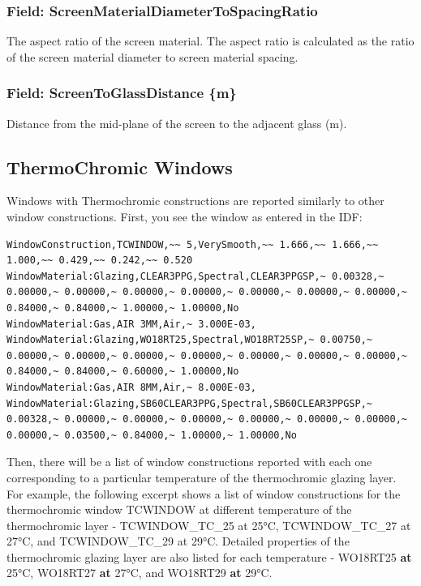 \subsubsection{Field: ScreenMaterialDiameterToSpacingRatio}\label{field-screenmaterialdiametertospacingratio}

The aspect ratio of the screen material. The aspect ratio is calculated as the ratio of the screen material diameter to screen material spacing.

\subsubsection{Field: ScreenToGlassDistance \{m\}}\label{field-screentoglassdistance-m}

Distance from the mid-plane of the screen to the adjacent glass (m).

\subsection{ThermoChromic Windows}\label{thermochromic-windows}

Windows with Thermochromic constructions are reported similarly to other window constructions. First, you see the window as entered in the IDF:

\begin{lstlisting}
WindowConstruction,TCWINDOW,~~ 5,VerySmooth,~~ 1.666,~~ 1.666,~~ 1.000,~~ 0.429,~~ 0.242,~~ 0.520
WindowMaterial:Glazing,CLEAR3PPG,Spectral,CLEAR3PPGSP,~ 0.00328,~ 0.00000,~ 0.00000,~ 0.00000,~ 0.00000,~ 0.00000,~ 0.00000,~ 0.00000,~ 0.84000,~ 0.84000,~ 1.00000,~ 1.00000,No
WindowMaterial:Gas,AIR 3MM,Air,~ 3.000E-03,
WindowMaterial:Glazing,WO18RT25,Spectral,WO18RT25SP,~ 0.00750,~ 0.00000,~ 0.00000,~ 0.00000,~ 0.00000,~ 0.00000,~ 0.00000,~ 0.00000,~ 0.84000,~ 0.84000,~ 0.60000,~ 1.00000,No
WindowMaterial:Gas,AIR 8MM,Air,~ 8.000E-03,
WindowMaterial:Glazing,SB60CLEAR3PPG,Spectral,SB60CLEAR3PPGSP,~ 0.00328,~ 0.00000,~ 0.00000,~ 0.00000,~ 0.00000,~ 0.00000,~ 0.00000,~ 0.00000,~ 0.03500,~ 0.84000,~ 1.00000,~ 1.00000,No
\end{lstlisting}

Then, there will be a list of window constructions reported with each one corresponding to a particular temperature of the thermochromic glazing layer. For example, the following excerpt shows a list of window constructions for the thermochromic window TCWINDOW at different temperature of the thermochromic layer - TCWINDOW\_TC\_25 at 25°C, TCWINDOW\_TC\_27 at 27°C, and TCWINDOW\_TC\_29 at 29°C. Detailed properties of the thermochromic glazing layer are also listed for each temperature - WO18RT25 \textbf{at} 25°C, WO18RT27 \textbf{at} 27°C, and WO18RT29 \textbf{at} 29°C.

